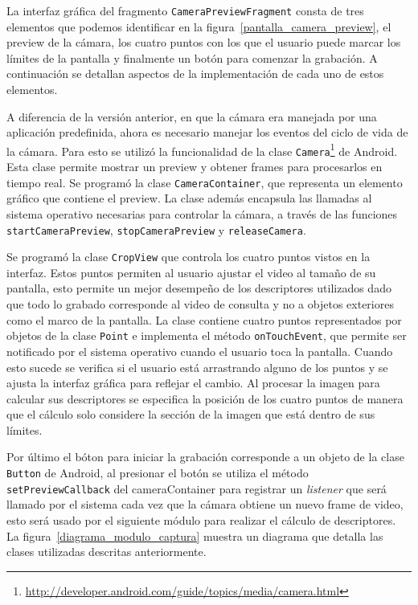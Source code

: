 La interfaz gráfica del fragmento \texttt{CameraPreviewFragment} consta de tres elementos que podemos identificar en la figura~\ref{pantalla_camera_preview}, el preview de la cámara, los cuatro puntos con los que el usuario puede marcar los límites de la pantalla y finalmente un botón para comenzar la grabación. A continuación se detallan aspectos de la implementación de cada uno de estos elementos.

A diferencia de la versión anterior, en que la cámara era manejada por una aplicación predefinida, ahora es necesario manejar los eventos del ciclo de vida de la cámara. Para esto se utilizó la funcionalidad de la clase \texttt{Camera}\footnote{\url{http://developer.android.com/guide/topics/media/camera.html}} de Android. Esta clase permite mostrar un preview y obtener frames para procesarlos en tiempo real. Se programó la clase \texttt{CameraContainer}, que representa un elemento gráfico que contiene el preview. La clase además encapsula las llamadas al sistema operativo necesarias para controlar la cámara, a través de las funciones \texttt{startCameraPreview}, \texttt{stopCameraPreview} y \texttt{releaseCamera}.

Se programó la clase \texttt{CropView} que controla los cuatro puntos vistos en la interfaz. Estos puntos permiten al usuario ajustar el video al tamaño de su pantalla, esto permite un mejor desempeño de los descriptores utilizados dado que todo lo grabado corresponde al video de consulta y no a objetos exteriores como el marco de la pantalla. La clase contiene cuatro puntos representados por objetos de la clase \texttt{Point} e implementa el método \texttt{onTouchEvent}, que permite ser notificado por el sistema operativo cuando el usuario toca la pantalla. Cuando esto sucede se verifica si el usuario está arrastrando alguno de los puntos y se ajusta la interfaz gráfica para reflejar el cambio. Al procesar la imagen para calcular sus descriptores se especifica la posición de los cuatro puntos de manera que el cálculo solo considere la sección de la imagen que está dentro de sus límites.

Por último el bóton para iniciar la grabación corresponde a un objeto de la clase \texttt{Button} de Android, al presionar el botón se utiliza el método \texttt{setPreviewCallback} del cameraContainer para registrar un \emph{listener} que será llamado por el sistema cada vez que la cámara obtiene un nuevo frame de video, esto será usado por el siguiente módulo para realizar el cálculo de descriptores. La figura~\ref{diagrama_modulo_captura} muestra un diagrama que detalla las clases utilizadas descritas anteriormente.

